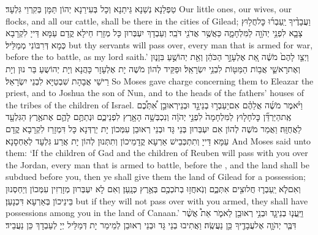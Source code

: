 {טַפְלַנָא נְשַׁנָא גֵּיתַנָא וְכָל בְּעִירַנָא יְהוֹן תַּמָּן בְּקִרְוֵי גִּלְעָד׃}
{Our little ones, our wives, our flocks, and all our cattle, shall be there in the cities of Gilead;}{}
{וַעֲבָדֶ֨יךָ יַֽעַבְר֜וּ כׇּל\maqqaf חֲל֥וּץ צָבָ֛א לִפְנֵ֥י יְהֹוָ֖ה לַמִּלְחָמָ֑ה כַּאֲשֶׁ֥ר אֲדֹנִ֖י דֹּבֵֽר׃}
{וְעַבְדָךְ יִעְבְּרוּן כָּל מְזָרַז חֵילָא קֳדָם עַמָּא דַּייָ לִקְרָבָא כְּמָא דְּרִבּוֹנִי מְמַלֵּיל׃}
{but thy servants will pass over, every man that is armed for war, before the \lord\space to battle, as my lord saith.’}{}
{וַיְצַ֤ו לָהֶם֙ מֹשֶׁ֔ה אֵ֚ת אֶלְעָזָ֣ר הַכֹּהֵ֔ן וְאֵ֖ת יְהוֹשֻׁ֣עַ בִּן\maqqaf נ֑וּן וְאֶת\maqqaf רָאשֵׁ֛י אֲב֥וֹת הַמַּטּ֖וֹת לִבְנֵ֥י יִשְׂרָאֵֽל׃}
{וּפַקֵּיד לְהוֹן מֹשֶׁה יָת אֶלְעָזָר כָּהֲנָא וְיָת יְהוֹשֻעַ בַּר נוּן וְיָת רֵישֵׁי אֲבָהָת שִׁבְטַיָּא לִבְנֵי יִשְׂרָאֵל׃}
{So Moses gave charge concerning them to Eleazar the priest, and to Joshua the son of Nun, and to the heads of the fathers’ houses of the tribes of the children of Israel.}{}
{וַיֹּ֨אמֶר מֹשֶׁ֜ה אֲלֵהֶ֗ם אִם\maqqaf יַעַבְר֣וּ בְנֵי\maqqaf גָ֣ד וּבְנֵי\maqqaf רְאוּבֵ֣ן \pasek  אִ֠תְּכֶ֠ם אֶֽת\maqqaf הַיַּרְדֵּ֞ן כׇּל\maqqaf חָל֤וּץ לַמִּלְחָמָה֙ לִפְנֵ֣י יְהֹוָ֔ה וְנִכְבְּשָׁ֥ה הָאָ֖רֶץ לִפְנֵיכֶ֑ם וּנְתַתֶּ֥ם לָהֶ֛ם אֶת\maqqaf אֶ֥רֶץ הַגִּלְעָ֖ד לַאֲחֻזָּֽה׃}
{וַאֲמַר מֹשֶׁה לְהוֹן אִם יִעְבְּרוּן בְּנֵי גָּד וּבְנֵי רְאוּבֵן עִמְּכוֹן יָת יַרְדְּנָא כָּל דִּמְזָרַז לִקְרָבָא קֳדָם עַמָּא דַּייָ וְתִתְכְּבֵישׁ אַרְעָא קֳדָמֵיכוֹן וְתִתְּנוּן לְהוֹן יָת אֲרַע גִּלְעָד לְאַחְסָנָא׃}
{And Moses said unto them: ‘If the children of Gad and the children of Reuben will pass with you over the Jordan, every man that is armed to battle, before the \lord, and the land shall be subdued before you, then ye shall give them the land of Gilead for a possession;}{}
{וְאִם\maqqaf לֹ֧א יַֽעַבְר֛וּ חֲלוּצִ֖ים אִתְּכֶ֑ם וְנֹֽאחֲז֥וּ בְתֹכְכֶ֖ם בְּאֶ֥רֶץ כְּנָֽעַן׃}
{וְאִם לָא יִעְבְּרוּן מְזָרְזִין עִמְּכוֹן וְיַחְסְנוּן בֵּינֵיכוֹן בְּאַרְעָא דִּכְנָעַן׃}
{but if they will not pass over with you armed, they shall have possessions among you in the land of Canaan.’}{}
{וַיַּֽעֲנ֧וּ בְנֵי\maqqaf גָ֛ד וּבְנֵ֥י רְאוּבֵ֖ן לֵאמֹ֑ר אֵת֩ אֲשֶׁ֨ר דִּבֶּ֧ר יְהֹוָ֛ה אֶל\maqqaf עֲבָדֶ֖יךָ כֵּ֥ן נַעֲשֶֽׂה׃}
{וַאֲתִיבוּ בְנֵי גָּד וּבְנֵי רְאוּבֵן לְמֵימַר יָת דְּמַלֵּיל יְיָ לְעַבְדָךְ כֵּן נַעֲבֵיד׃}
